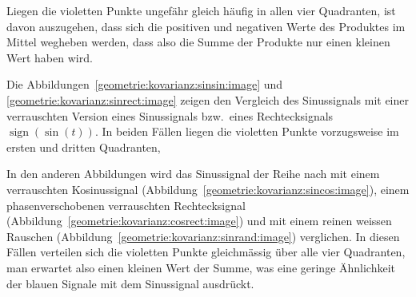 Liegen die violetten Punkte ungefähr gleich häufig in allen vier Quadranten,
ist davon auszugehen, dass sich die positiven und negativen Werte des
Produktes im Mittel wegheben werden, dass also die Summe der
Produkte nur einen kleinen Wert haben wird.

Die Abbildungen~\ref{geometrie:kovarianz:sinsin:image} und
\ref{geometrie:kovarianz:sinrect:image} zeigen den Vergleich
des Sinussignals mit einer verrauschten Version eines Sinussignals
bzw.~eines Rechtecksignals $\operatorname{sign}(\sin(t))$.
In beiden Fällen liegen die violetten Punkte vorzugsweise im ersten
und dritten Quadranten, 

In den anderen Abbildungen
wird das Sinussignal der Reihe nach mit einem verrauschten
Kosinussignal (Abbildung~\ref{geometrie:kovarianz:sincos:image}),
einem phasenverschobenen verrauschten Rechtecksignal
(Abbildung~\ref{geometrie:kovarianz:cosrect:image})
und mit einem reinen weissen Rauschen
(Abbildung~\ref{geometrie:kovarianz:sinrand:image})
verglichen.
In diesen Fällen verteilen sich die violetten Punkte gleichmässig
über alle vier Quadranten, man erwartet also einen kleinen Wert
der Summe, was eine geringe Ähnlichkeit der blauen Signale mit dem
Sinussignal ausdrückt.


